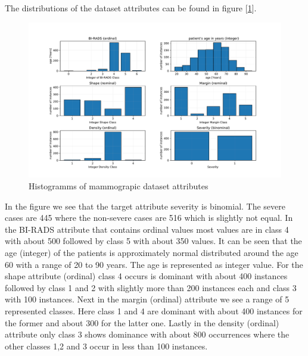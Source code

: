 \documentclass[11pt]{article}
\begin{document}
The distributions of the dataset attributes can be found in figure [\ref{fig:Mamm}].

\begin{figure}[H]\center
\includegraphics[width=0.8\linewidth]{Mammograph.pdf}
\caption{Histogramms of mammograpic dataset attributes}
\label{fig:Mamm}
\end{figure}

In the figure we see that the target attribute severity is binomial. The severe cases are 445 where the non-severe cases are 516 which is slightly not equal. In the BI-RADS attribute that contains ordinal values most values are in class 4 with about 500 followed by class 5 with about 350 values. It can be seen that the age (integer) of the patients is approximately normal distributed around the age 60 with a range of 20 to 90 years. The age is represented as integer value. For the shape attribute (ordinal) class 4 occurs is dominant with about 400 instances followed by class 1 and 2 with slightly more than 200 instances each and class 3 with 100 instances. Next in the margin (ordinal) attribute we see a range of 5 represented classes. Here class 1 and 4 are dominant with about 400 instances for the former and about 300 for the latter one. Lastly in the density (ordinal) attribute only class 3 shows dominance with about 800 occurrences where the other classes 1,2 and 3 occur in less than 100 instances.

\newpage
\end{document}
